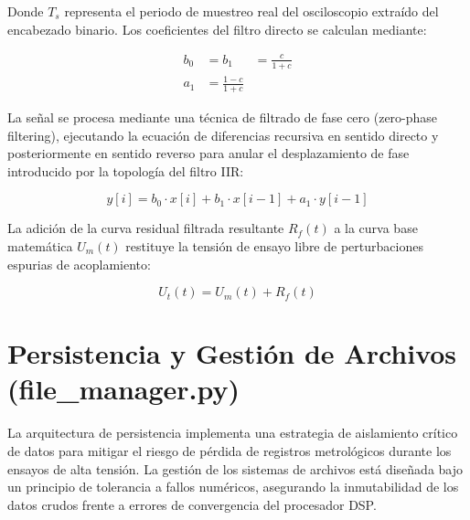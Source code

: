 Donde $T_s$ representa el periodo de muestreo real del osciloscopio extraído del encabezado binario. Los coeficientes del filtro directo se calculan mediante:

\begin{align*}
    b_0 &= b_1 &= \frac{c}{1+c}\\
    a_1 &= \frac{1-c}{1+c}
\end{align*}

La señal se procesa mediante una técnica de filtrado de fase cero (zero-phase filtering), ejecutando la ecuación de diferencias recursiva en sentido directo y posteriormente en sentido reverso para anular el desplazamiento de fase introducido por la topología del filtro IIR:

\begin{equation}
    y[i] = b_0 \cdot x[i] + b_1 \cdot x[i-1] + a_1 \cdot y[i-1]
    \label{eq:ecuacion_filtro}
\end{equation}

La adición de la curva residual filtrada resultante $R_f(t)$ a la curva base matemática $U_m(t)$ restituye la tensión de ensayo libre de perturbaciones espurias de acoplamiento:

\begin{equation}
    U_t(t) = U_m(t)+ R_f(t)    
\end{equation}

\section{Persistencia y Gestión de Archivos (file\_manager.py)}
La arquitectura de persistencia implementa una estrategia de aislamiento crítico de datos para mitigar el riesgo de pérdida de registros metrológicos durante los ensayos de alta tensión. La gestión de los sistemas de archivos está diseñada bajo un principio de tolerancia a fallos numéricos, asegurando la inmutabilidad de los datos crudos frente a errores de convergencia del procesador DSP.

